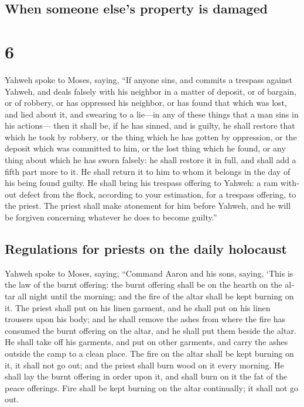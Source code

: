\begin{paracol}{2}
\switchcolumn
\begin{otherlanguage}{english}

\hypertarget{when-someone-elses-property-is-damaged}{%
\subsection{When someone else's property is
damaged}\label{when-someone-elses-property-is-damaged}}

\hypertarget{section-11}{%
\section{6}\label{section-11}}

 Yahweh spoke to Moses, saying,  ``If anyone
sins, and commits a trespass against Yahweh, and deals falsely with his
neighbor in a matter of deposit, or of bargain, or of robbery, or has
oppressed his neighbor,  or has found that which was lost,
and lied about it, and swearing to a lie---in any of these things that a
man sins in his actions---  then it shall be, if he has
sinned, and is guilty, he shall restore that which he took by robbery,
or the thing which he has gotten by oppression, or the deposit which was
committed to him, or the lost thing which he found,  or
any thing about which he has sworn falsely: he shall restore it in full,
and shall add a fifth part more to it. He shall return it to him to whom
it belongs in the day of his being found guilty.  He shall
bring his trespass offering to Yahweh: a ram without defect from the
flock, according to your estimation, for a trespass offering, to the
priest.  The priest shall make atonement for him before
Yahweh, and he will be forgiven concerning whatever he does to become
guilty.''

\hypertarget{regulations-for-priests-on-the-daily-holocaust}{%
\subsection{Regulations for priests on the daily
holocaust}\label{regulations-for-priests-on-the-daily-holocaust}}

 Yahweh spoke to Moses, saying,  ``Command
Aaron and his sons, saying, `This is the law of the burnt offering: the
burnt offering shall be on the hearth on the altar all night until the
morning; and the fire of the altar shall be kept burning on it.
 The priest shall put on his linen garment, and he shall
put on his linen trousers upon his body; and he shall remove the ashes
from where the fire has consumed the burnt offering on the altar, and he
shall put them beside the altar.  He shall take off his
garments, and put on other garments, and carry the ashes outside the
camp to a clean place.  The fire on the altar shall be
kept burning on it, it shall not go out; and the priest shall burn wood
on it every morning. He shall lay the burnt offering in order upon it,
and shall burn on it the fat of the peace offerings. 
Fire shall be kept burning on the altar continually; it shall not go
out.


\end{otherlanguage}
\end{paracol}
